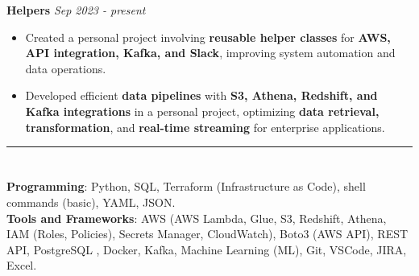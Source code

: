 \documentclass[a4paper,10pt]{article}
\begin{document}
\vspace{-2mm}
\textbf{Helpers} \href{https://github.com/ShreehariA/helpers}{} \hfill \textit{Sep 2023 - present}
\vspace{-2mm}
\begin{itemize}
    \item Created a personal project involving \textbf{reusable helper classes} for \textbf{AWS, API integration, Kafka, and Slack}, improving system automation and data operations.
    \vspace{-2mm}
    \item Developed efficient \textbf{data pipelines} with \textbf{S3, Athena, Redshift, and Kafka integrations} in a personal project, optimizing \textbf{data retrieval, transformation}, and \textbf{real-time streaming} for enterprise applications.
\end{itemize}

\hrule
\vspace{-4mm}
\section{\scshape\color{Fuchsia}{\faTools\ \textbf TECHNICAL SKILLS}}
\textbf{Programming}: Python, SQL, Terraform (Infrastructure as Code), shell commands (basic), YAML, JSON. \\
\textbf{Tools and Frameworks}: AWS (AWS Lambda, Glue, S3, Redshift, Athena, IAM (Roles, Policies), Secrets Manager, CloudWatch), Boto3 (AWS API), REST API, PostgreSQL
, Docker, Kafka, Machine Learning (ML), Git, VSCode, JIRA, Excel.
\end{document}
